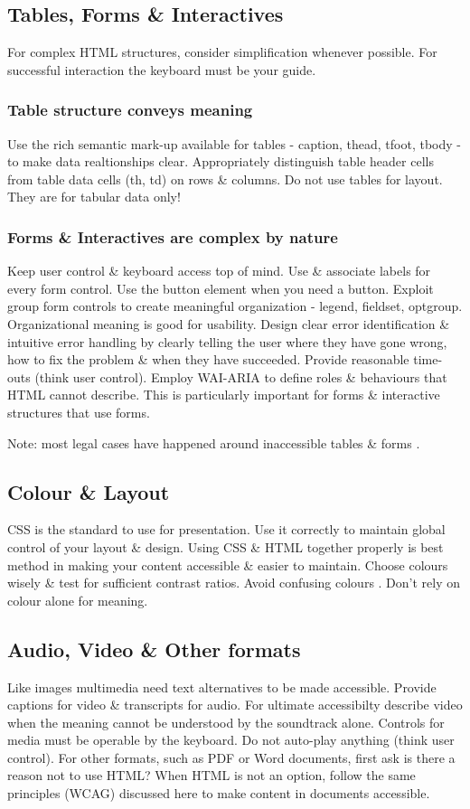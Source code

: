 \documentclass{acm_proc_article-sp}
\begin{document}
\subsection{Tables, Forms \& Interactives}
For complex HTML structures, consider simplification whenever possible. For successful interaction the keyboard must be your guide.
\subsubsection{Table structure conveys meaning}
Use the rich semantic mark-up available for tables - caption, thead, tfoot, tbody - to make data realtionships clear. Appropriately distinguish table header cells from table data cells (th, td) on rows \& columns. Do not use tables for layout. They are for tabular data only!
\subsubsection{Forms \& Interactives are complex by nature}
Keep user control \& keyboard access top of mind. Use \& associate labels for every form control. Use the button element when you need a button. Exploit group form controls to create meaningful organization - legend, fieldset, optgroup. Organizational meaning is good for usability. Design clear error identification \& intuitive error handling by clearly telling the user where they have gone wrong, how to fix the problem \& when they have succeeded. Provide reasonable time-outs (think user control). Employ WAI-ARIA \cite{horton:w4e} to define roles \& behaviours that HTML cannot describe. This is particularly important for forms \& interactive structures that use forms.

Note: most legal cases have happened around inaccessible tables \& forms \cite{monsebraaten:victory}.

\subsection{Colour \& Layout}
CSS is the standard to use for presentation. Use it correctly to maintain global control of your layout \& design. Using CSS \& HTML together properly is best method in making your content accessible \& easier to maintain. Choose colours wisely \& test for sufficient contrast ratios. Avoid confusing colours \cite{brewer:pal}. Don't rely on colour alone for meaning.

\subsection{Audio, Video \& Other formats}
Like images multimedia need text alternatives to be made accessible. Provide captions for video \& transcripts for audio. For ultimate accessibilty describe video when the meaning cannot be understood by the soundtrack alone. Controls for media must be operable by the keyboard. Do not auto-play anything (think user control). For other formats, such as PDF or Word documents, first ask is there a reason not to use HTML? When HTML is not an option, follow the same principles (WCAG) discussed here to make content in documents accessible.
\end{document}
